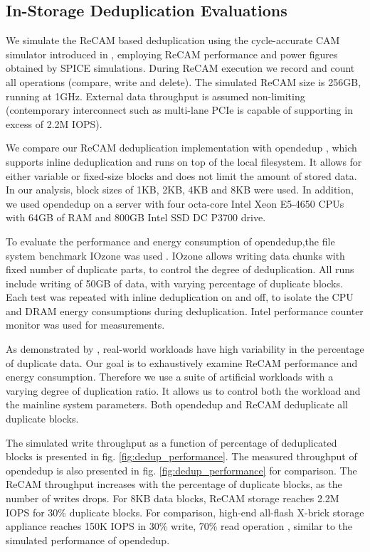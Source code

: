 \documentclass{superfri}
\begin{document}
	
	\subsection{In-Storage Deduplication Evaluations}
	
	We simulate the ReCAM based deduplication using the cycle-accurate CAM simulator introduced in \cite{yavits2015resistive}, employing ReCAM performance and power figures obtained by SPICE simulations. During ReCAM execution we record and count all operations (compare, write and delete).  The simulated ReCAM size is 256GB, running at 1GHz. External data throughput is assumed non-limiting (contemporary interconnect such as multi-lane PCIe is capable of supporting in excess of 2.2M IOPS).
	
	We compare our ReCAM deduplication implementation with opendedup ‎\cite{silverberg2010opendedup}, which supports inline deduplication and runs on top of the local filesystem. It allows for either variable or fixed-size blocks and does not limit the amount of stored data. In our analysis, block sizes of 1KB, 2KB, 4KB and 8KB were used. In addition, we used opendedup on a server with four octa-core Intel Xeon E5-4650 CPUs with 64GB of RAM and 800GB Intel SSD DC P3700 drive.
	
	To evaluate the performance and energy consumption of opendedup,the file system benchmark IOzone was used \cite{norcott2003iozone}. IOzone allows writing data chunks with fixed number of duplicate parts, to control the degree of deduplication. All runs include writing of 50GB of data, with varying percentage of duplicate blocks. Each test was repeated with inline deduplication on and off, to isolate the CPU and DRAM energy consumptions during deduplication. Intel performance counter monitor \cite{intelPCM} was used for measurements. 
	
	As demonstrated by ‎\cite{zhu2008avoiding}, real-world workloads have high variability in the percentage of duplicate data. Our goal is to exhaustively examine ReCAM performance and energy consumption. Therefore we use a suite of artificial workloads with a varying degree of duplication ratio. It allows us to control both the workload and the mainline system parameters. Both opendedup and ReCAM deduplicate all duplicate blocks.
	
	The simulated write throughput as a function of percentage of deduplicated blocks is presented in fig. \ref{fig:dedup_performance}. The measured throughput of opendedup is also presented in fig. \ref{fig:dedup_performance} for comparison. The ReCAM throughput increases with the percentage of duplicate blocks, as the number of writes drops. For 8KB data blocks, ReCAM storage reaches 2.2M IOPS for 30\% duplicate blocks. For comparison, high-end all-flash X-brick storage appliance reaches 150K IOPS in 30\% write, 70\% read operation \cite{XbrickSpec}, similar to the simulated performance of opendedup. 
	
\end{document}
